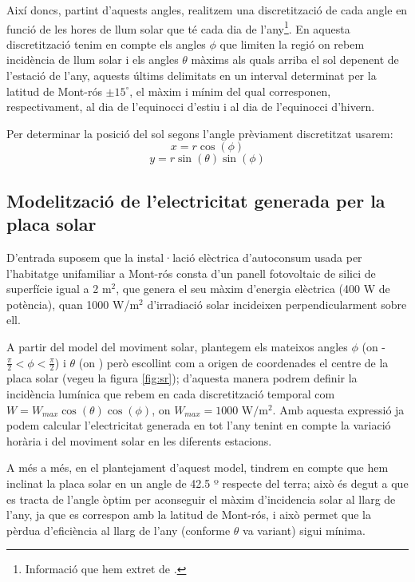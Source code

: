 \documentclass[10pt, twoside, a4paper]{article}
\begin{document}
Així doncs, partint d'aquests angles, realitzem una discretització de cada angle en funció de les hores de llum solar que té cada dia de l'any\footnote{Informació que hem extret de \cite{ref5}.}. En aquesta discretització tenim en compte els angles $\phi$ que limiten la regió on rebem incidència de llum solar i els angles $\theta$ màxims als quals arriba el sol depenent de l'estació de l'any, aquests últims delimitats en un interval determinat per la latitud de Mont-rós $\pm 15^\circ$, el màxim i mínim del qual corresponen, respectivament, al dia de l'equinocci d'estiu i al dia de l'equinocci d'hivern.

Per determinar la posició del sol segons l'angle prèviament discretitzat usarem:
\begin{equation}
    x = r\cos(\phi)
\end{equation}
\begin{equation}
    y = r\sin(\theta)\sin(\phi)
\end{equation}

\subsection{Modelització de l'electricitat generada per la placa solar}
D'entrada suposem que la instal·lació elèctrica d'autoconsum usada per l'habitatge unifamiliar a Mont-rós consta d'un panell fotovoltaic de silici de superfície igual a 2 m$^2$, que genera el seu màxim d'energia elèctrica (400 W de potència), quan 1000 W/m$^2$ d'irradiació solar incideixen perpendicularment sobre ell.

A partir del model del moviment solar, plantegem els mateixos angles $\phi$ (on -$\frac{\pi}{2}<\phi <\frac{\pi}{2}$) i $\theta$ (on ) però escollint com a origen de coordenades el centre de la placa solar (vegeu la figura \ref{fig:sr}); d'aquesta manera podrem definir la incidència lumínica que rebem en cada discretització temporal com $W = W_{max}\cos(\theta)\cos(\phi)$, on $W_{max} = 1000 \text{ W/m$^2$}$. Amb aquesta expressió ja podem calcular l'electricitat generada en tot l'any tenint en compte la variació horària i del moviment solar en les diferents estacions.

A més a més, en el plantejament d'aquest model, tindrem en compte que  hem inclinat la placa solar en un angle de 42.5 º respecte del terra; això és degut a que es tracta de l'angle òptim per aconseguir el màxim d'incidencia solar al llarg de l'any, ja que es correspon amb la latitud de Mont-rós, i això permet que la pèrdua d'eficiència al llarg de l'any (conforme $\theta$ va variant) sigui mínima.
\end{document}
